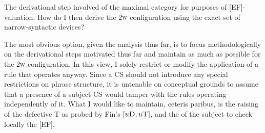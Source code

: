 \documentclass[output=paper]{langsci/langscibook}
\begin{document}
\begin{exe}
	\ex
	\hfill
		\hfill\null
	\label{tree3}
\end{exe}

The derivational step involved  of the maximal category for purposes of
[\gls{EF}]-valuation. How do I then derive the \textsc{2w} configuration
using the exact set of narrow-syntactic devices?

The most obvious option, given the analysis thus far, is to focus
methodologically on the derivational steps motivated thus far and maintain as
much as possible for the \textsc{2w} configuration. In this view, I solely
restrict or modify the application of a rule that operates anyway. Since a
\gls{CS} should not introduce any special restrictions on phrase structure, it
is untenable on conceptual grounds to assume that a presence of a subject CS
would tamper with the rules operating independently of it. What I would like to
maintain, ceteris paribus, is the raising of the defective T as
probed by Fin's $[u\textsc{D},u\textsc{T}]$, and the  of the
subject to check locally the [\gls{EF}].
\end{document}
